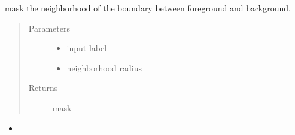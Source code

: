 \documentclass[letterpaper,10pt,english]{sphinxmanual}
\begin{document}
\begin{fulllineitems}
\label{\detokenize{index:unet.loss.mask_boundary_neighborhood}}
mask the neighborhood of the boundary between foreground and background.
\begin{quote}\begin{description}
\item[{Parameters}] \leavevmode\begin{itemize}
\item {} 
 \textendash{} input label

\item {} 
 \textendash{} neighborhood radius

\end{itemize}

\item[{Returns}] \leavevmode
mask

\end{description}\end{quote}



\begin{itemize}
\item {} 

\end{itemize}



\end{fulllineitems}

\end{document}
